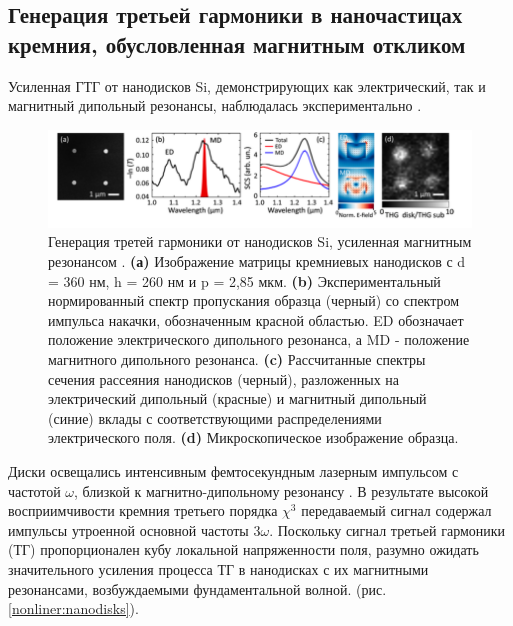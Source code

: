 \subsection*{Генерация третьей гармоники в наночастицах кремния, обусловленная магнитным откликом}
\hspace*{2mm}
Усиленная ГТГ от нанодисков Si, демонстрирующих как электрический, так и магнитный дипольный резонансы, наблюдалась экспериментально \cite{shcherbakov2014enhanced}. 
\begin{figure}[h!]
	\centering
	\includegraphics[width=1\linewidth]{images/fig4.png}
	\caption{Генерация третей гармоники от нанодисков Si, усиленная магнитным резонансом . \textbf{(а)} Изображение матрицы кремниевых нанодисков с d = 360 нм, h = 260 нм и p = 2,85 мкм. \textbf{(b)} Экспериментальный нормированный спектр пропускания образца (черный) со спектром импульса накачки, обозначенным красной областью. ED  обозначает положение электрического дипольного резонанса, а MD - положение магнитного дипольного резонанса. \textbf{(c) }Рассчитанные спектры сечения рассеяния нанодисков (черный), разложенных на электрический дипольный (красные) и магнитный дипольный (синие) вклады с соответствующими распределениями электрического поля. \textbf{(d)} Микроскопическое изображение образца. \cite{shcherbakov2014enhanced}}
	\label{nonliner:nanodisks1}
\end{figure}
\hspace*{2mm}
Диски освещались интенсивным фемтосекундным лазерным импульсом с частотой $\omega$, близкой к магнитно-дипольному резонансу . В результате высокой восприимчивости кремния третьего порядка $\chi^3$ передаваемый сигнал содержал импульсы утроенной основной частоты $3\omega$. Поскольку сигнал третьей гармоники (ТГ) пропорционален кубу локальной напряженности поля, разумно ожидать значительного усиления процесса ТГ в нанодисках с их магнитными резонансами, возбуждаемыми фундаментальной волной. (рис. \ref{nonliner:nanodisks}). 
